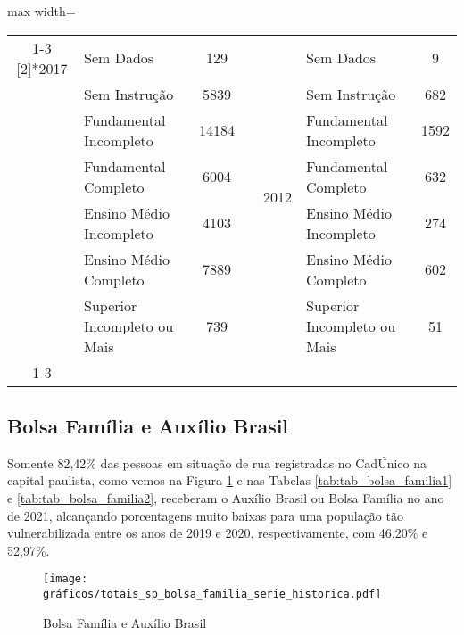 \documentclass[14pt]{extarticle}
\begin{document}
\begin{table}[htbp]
\begin{adjustbox}{max width=\linewidth}
\begin{tabular}{clccclc}
\cmidrule{1-3}\cmidrule{5-7}    \multirow{7}[2]{*}{2017} & Sem Dados & 129  &      & \multirow{7}[2]{*}{2012} & Sem Dados & 9 \\
         & Sem Instrução & 5839 &      &      & Sem Instrução & 682 \\
         & Fundamental Incompleto & 14184 &      &      & Fundamental Incompleto & 1592 \\
         & Fundamental Completo & 6004 &      &      & Fundamental Completo & 632 \\
         & Ensino Médio Incompleto & 4103 &      &      & Ensino Médio Incompleto & 274 \\
         & Ensino Médio Completo & 7889 &      &      & Ensino Médio Completo & 602 \\
         & Superior Incompleto ou Mais & 739  &      &      & Superior Incompleto ou Mais & 51 \\
\cmidrule{1-3}\cmidrule{5-7}    
\end{tabular}%
   \end{adjustbox}
  \label{tab:tab_escolaridade2}%
\end{table}%


\subsection{Bolsa Família e Auxílio Brasil}

Somente 82,42\% das pessoas em situação de rua registradas no CadÚnico na capital paulista, como vemos na Figura \ref{fig:bolsa_familia} e nas Tabelas \ref{tab:tab_bolsa_familia1} e \ref{tab:tab_bolsa_familia2}, receberam o Auxílio Brasil ou Bolsa Família no ano de 2021, alcançando porcentagens muito baixas para uma população tão vulnerabilizada entre os anos de 2019 e 2020, respectivamente, com 46,20\% e 52,97\%. \\


%
\begin{figure}[H]
\centering
	\caption{Bolsa Família e Auxílio Brasil}
	\texttt{[image: gráficos/totais\_sp\_bolsa\_familia\_serie\_historica.pdf]}
	\label{fig:bolsa_familia}
\end{figure}

\end{document}
